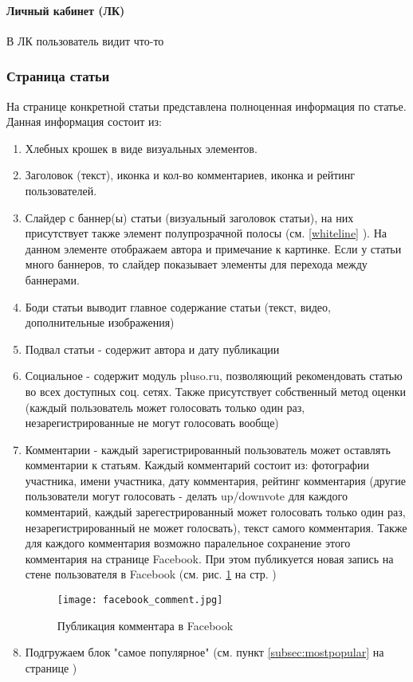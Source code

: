 \documentclass[DIV=calc, paper=a4, fontsize=11pt]{scrartcl} %
\begin{document}
\paragraph{Личный кабинет (ЛК)}
В ЛК пользователь видит что-то 


\subsubsection{Страница статьи}
На странице конкретной статьи представлена полноценная информация по статье. Данная информация состоит из:

\begin{enumerate}
    \item Хлебных крошек в виде визуальных элементов. 
    \item Заголовок (текст), иконка и кол-во комментариев, иконка и рейтинг пользователей.
    \item Слайдер с баннер(ы) статьи (визуальный заголовок статьи), на них присутствует также элемент полупрозрачной полосы (см. \ref{whiteline} ). На данном элементе отображаем автора и примечание к картинке. Если у статьи много баннеров, то слайдер показывает элементы для перехода между баннерами.
    \item Боди статьи выводит главное содержание статьи (текст, видео, дополнительные изображения)
    \item Подвал статьи - содержит автора и дату публикации
    \item Социальное - содержит модуль pluso.ru, позволяющий рекомендовать статью во всех доступных соц. сетях. Также присутствует собственный метод оценки (каждый пользователь может голосовать только один раз, незарегистрированные не могут голосовать вообще)
    \item Комментарии - каждый зарегистрированный пользователь может оставлять комментарии к статьям. Каждый комментарий состоит из: фотографии участника, имени участника, дату комментария, рейтинг комментария (другие пользователи могут голосовать - делать up/downvote для каждого комментарий, каждый зарегестрированный может голосовать только один раз, незарегистрированный не может голосвать), текст самого комментария. Также для каждого комментария возможно паралельное сохранение этого комментария на странице Facebook. При этом публикуется новая запись на стене пользователя в Facebook (см. рис. \ref{fig:facebook_comment.jpg} на стр. \pageref{fig:facebook_comment.jpg})
        \begin{figure}[ht!]
        \centering
        \texttt{[image: facebook\_comment.jpg]}
        \caption{Публикация комментара в Facebook \label{fig:facebook_comment.jpg}}
        \end{figure}
    \item Подгружаем блок "самое популярное" (см. пункт \ref{subsec:mostpopular} на странице \pageref{subsec:mostpopular} )
\end{enumerate}
\end{document}
